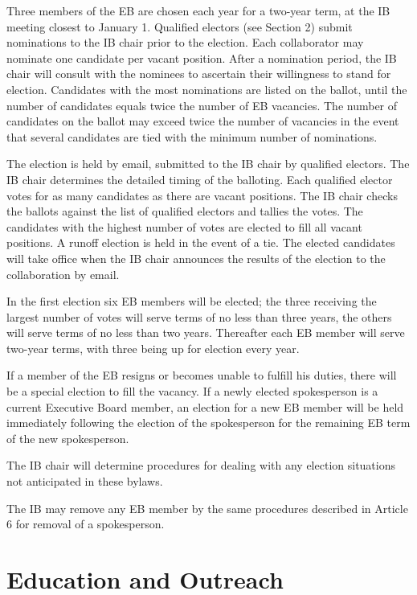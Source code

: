 \documentclass[12pt]{article}
\begin{document}
Three members of the EB are chosen each year for a two-year term, at the IB meeting closest to January 1. Qualified electors (see Section 2) submit nominations to the IB chair prior to the election. Each collaborator may nominate one candidate per vacant position. After a nomination period, the IB chair will consult with the nominees to ascertain their willingness to stand for election. Candidates with the most nominations are listed on the ballot, until the number of candidates equals twice the number of EB vacancies. The number of candidates on the ballot may exceed twice the number of vacancies in the event that several candidates are tied with the minimum number of nominations.

The election is held by email, submitted to the IB chair by qualified electors. The IB chair determines the detailed timing of the balloting. Each qualified elector votes for as many candidates as there are vacant positions. The IB chair checks the ballots against the list of qualified electors and tallies the votes. The candidates with the highest number of votes are elected to fill all vacant positions. A runoff election is held in the event of a tie. The elected candidates will take office when the IB chair announces the results of the election to the collaboration by email.

In the first election six EB members will be elected; the three receiving the largest number of votes will serve terms of no less than three years, the others will serve terms of no less than two years. Thereafter each EB member will serve two-year terms, with three being up for election every year.

If a member of the EB resigns or becomes unable to fulfill his duties, there will be a special election to fill the vacancy. If a newly elected spokesperson is a current Executive Board member, an election for a new EB member will be held immediately following the election of the spokesperson for the remaining EB term of the new spokesperson.

The IB chair will determine procedures for dealing with any election situations not anticipated in these bylaws.

The IB may remove any EB member by the same procedures described in Article 6 for removal of a spokesperson.



\section{Education and Outreach}
\end{document}
